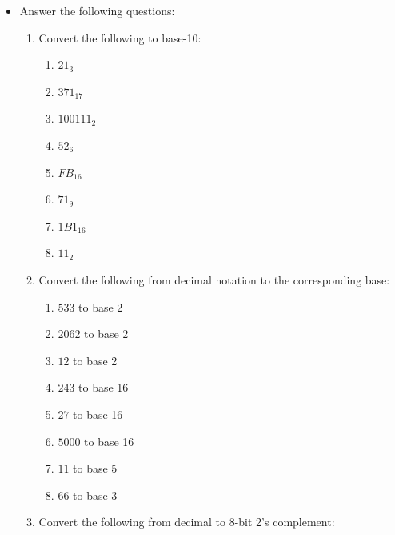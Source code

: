 \documentclass[10pt]{article}
\begin{document}
\begin{itemize}

\setlength\itemsep{10mm}


\item Answer the following questions:



  \begin{enumerate}
\setlength\itemsep{5mm}
\item Convert the following to base-10:
\begin{enumerate}[label=\Alph*]

\item $21_3$

\item $371_17$

\item $100111_2$

\item $52_6$

\item $FB_{16}$

\item $71_9$

\item $1B1_{16}$

\item $11_2$

\end{enumerate}

\item Convert the following from decimal notation to the corresponding base:
\begin{enumerate}[label=\Alph*]


\item $533$ to base 2

\item $2062$ to base 2

\item $12$ to base 2

\item $243$ to base 16

\item $27$ to base 16

\item $5000$ to base 16

\item $11$ to base 5

\item $66$ to base 3
\end{enumerate}

\item Convert the following from decimal to 8-bit 2's complement:
\begin{enumerate}[label=\Alph*]



\end{enumerate}
\end{enumerate}
\end{itemize}
\end{document}
